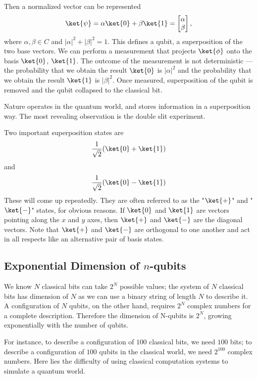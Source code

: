   Then a normalized vector can be represented
\[\ket{\psi} = \alpha \ket{0} + \beta \ket{1} =  \begin{bmatrix}
           \alpha \\
           \beta 
    \end{bmatrix},
\] 
where \(\alpha, \beta \in C\) and \(|\alpha|^2 + |\beta|^2 = 1\). This defines a qubit, a superposition of the two base vectors. We can perform a measurement that projects \(\ket{\phi}\) onto the basis \(\ket{0}\), \(\ket{1}\). The outcome of the measurement is not deterministic — the probability that we obtain the result \(\ket{0}\) is \(|\alpha|^2\) and the probability that we obtain the result \(\ket{1}\) is \(|\beta|^2\). Once measured, superposition of the qubit is removed and the qubit collapsed to the classical bit. 

Nature operates in the quantum world, and stores information in a superposition way. The most revealing observation is the double slit experiment. 

Two important superposition states are
\[\frac{1}{\sqrt{2}}(\ket{0} +\ket{1}) \]
and
\[\frac{1}{\sqrt{2}}(\ket{0} - \ket{1}) \]
These will come up repeatedly. They are often referred to as the "\(\ket{+}\)" and "\(\ket{-}\)" states, for obvious reasons. If \(\ket{0}\) and \(\ket{1}\) are vectors pointing along the \(x\) and \(y\) axes, then \(\ket{+}\) and \(\ket{-}\) are the diagonal vectors. Note that \(\ket{+}\) and \(\ket{-}\) are orthogonal to one another and act in all respects like an alternative pair of basis states. 

\subsection{Exponential Dimension of \(n\)-qubits}
We know \(N\) classical bits can take \(2^N\) possible values; the system of \(N\) classical bits has dimension of \(N\) as we can use a binary string of length \(N\) to describe it. A configuration of \(N\) qubits, on the other hand, requires \(2^N\) complex numbers for a complete description. Therefore the dimension of N-qubits is \(2^N\), growing exponentially with the number of qubits.   

For instance, to describe a configuration of \(100\) classical bits, we need \(100\) bits; to describe a configuration of \(100\) qubits in the classical world, we need \(2^{100}\) complex numbers. Here lies the difficulty of using classical computation systems to simulate a quantum world.


